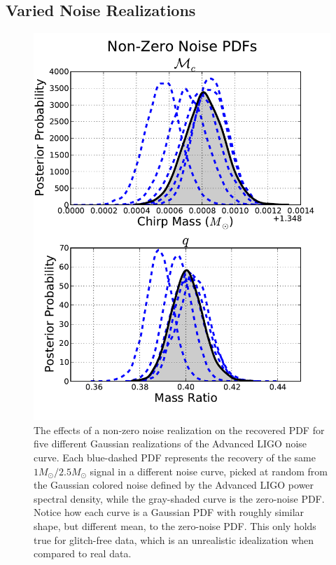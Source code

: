 \documentclass[11pt,a4paper]{emulateapj} 
\begin{document}
\subsection{Varied Noise Realizations}
\label{noiseSection}

\begin{figure}[ht!]
  \centering \includegraphics[trim=0cm 0cm 0cm 0cm,
    clip=true,scale=0.52]{noisePDF.pdf}
 \caption{The effects of a non-zero noise realization on the recovered
   PDF for five different Gaussian realizations of the Advanced LIGO
   noise curve.  Each blue-dashed PDF represents the recovery of the same
   $1M_{\odot}/2.5M_{\odot}$ signal in a different noise curve, picked
   at random from the Gaussian colored noise defined by the Advanced
   LIGO power spectral density, while the gray-shaded curve is the
   zero-noise PDF.  Notice how each curve is a Gaussian PDF with roughly similar shape,
   but different mean, to the zero-noise PDF.  This
   only holds true for glitch-free data, which is an unrealistic
   idealization when compared to real data.}
 \label{noisePDFs}
\end{figure}
  
\end{document}
